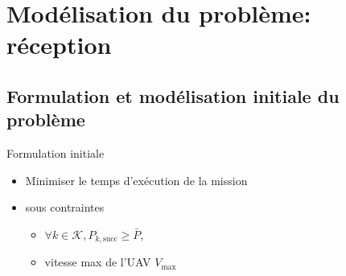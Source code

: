 \section{Modélisation du problème: réception}

\subsection[Modèle initial]{Formulation et modélisation initiale du problème}
\begin{frame}{Formulation initiale}
  \begin{itemize}
  \item Minimiser le temps d'exécution de la mission
  \item sous contraintes
    \begin{itemize}
    \item \( \forall k \in \mathcal{K}, P_{k, \text{succ}} \geq
      \bar{P} \),
    \item vitesse max de l'UAV \( V_{\text{max}} \)
    \end{itemize}
  \end{itemize}
      
\end{frame}

